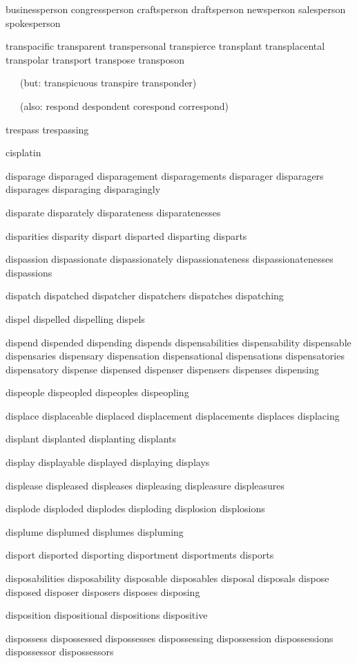 \begin{itemize}
businessperson congressperson craftsperson draftsperson newsperson salesperson spokesperson

transpacific transparent transpersonal transpierce  transplant transplacental transpolar transport transpose transposon

\ \ \ (but: transpicuous transpire transponder)

\ \ \ (also: respond despondent corespond correspond)

trespass trespassing

cisplatin

disparage disparaged disparagement disparagements disparager disparagers disparages disparaging disparagingly

disparate disparately disparateness disparatenesses

disparities disparity dispart disparted disparting disparts

dispassion dispassionate dispassionately dispassionateness dispassionatenesses dispassions

dispatch dispatched dispatcher dispatchers dispatches dispatching

dispel dispelled dispelling dispels

dispend dispended dispending dispends dispensabilities dispensability dispensable dispensaries dispensary dispensation dispensational dispensations dispensatories dispensatory dispense dispensed dispenser dispensers dispenses dispensing

dispeople dispeopled dispeoples dispeopling

displace displaceable displaced displacement displacements displaces displacing

displant displanted displanting displants

display displayable displayed displaying displays

displease displeased displeases displeasing displeasure displeasures

displode disploded displodes disploding displosion displosions

displume displumed displumes displuming

disport disported disporting disportment disportments disports

disposabilities disposability disposable disposables disposal disposals dispose disposed disposer disposers disposes disposing

disposition dispositional dispositions dispositive

dispossess dispossessed dispossesses dispossessing dispossession dispossessions dispossessor dispossessors


\end{itemize}
